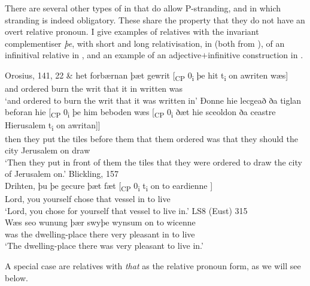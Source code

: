 \documentclass[output=paper]{langsci/langscibook}
\begin{document}
There are several other types of  in 
that do allow P-stranding, and in which stranding is indeed obligatory. These
share the property that they do not have an overt relative pronoun. I give
examples of relatives with the invariant complementiser \textit{þe}, with short
and long relativisation, in  (both from
\citealt[147--148]{vanKemenade1987}), of an infinitival relative in
, and an example of an adjective$+$infinitive construction in
.

\ea%
    \label{ex:11.3} Orosius, 141, 22 \parencite[147]{vanKemenade1987}
    \ea
	\gll \& het         forbærnan þæt gewrit [\textsubscript{CP} 0\textsubscript{i} þe   hit  t\textsubscript{i} on awriten wæs]\\
		and ordered burn          the   writ {} {}           that it  {}    in written   was\\
	\glt ‘and ordered to burn the writ that it was written in’
	\ex
	\gll Đonne hie lecgeað ða tiglan beforan  hie    [\textsubscript{CP} 0\textsubscript{i} þe    him beboden wæs [\textsubscript{CP} 0\textsubscript{i} ðæt hie sceoldon ða ceastre Hierusalem  t\textsubscript{i} on awritan]]\\
		then    they put     the tiles   before    them  {} {}        that  them ordered was {} {} that they should the city Jerusalem             {} on  draw\\
	\glt ‘Then they put in front of them the tiles that they were ordered to draw the city of Jerusalem on.’
	\z
\ex Blickling, 157 \parencite[151]{vanKemenade1987}\label{ex:11.4}\\
    \gll Drihten, þu   þe           gecure þæt fæt      [\textsubscript{CP} 0\textsubscript{i}     t\textsubscript{i} on to eardienne ]\\
        Lord,      you yourself chose   that vessel  {} {} {}                  in to live\\
    \glt ‘Lord, you chose for yourself that vessel to live in.’
\pagebreak
\ex LS8 (Eust) 315 \parencite[266]{Fischeretal:2000}%
    \label{ex:11.5}\\
    \gll Wæs seo wunung       þær    swyþe wynsum on  to wicenne \\
        was the dwelling-place  there very   pleasant  in  to live\\
    \glt `The dwelling-place there was very pleasant to live in.'
\z

A special case are relatives with \textit{that} as the relative pronoun form,
as we will see below.
\end{document}
